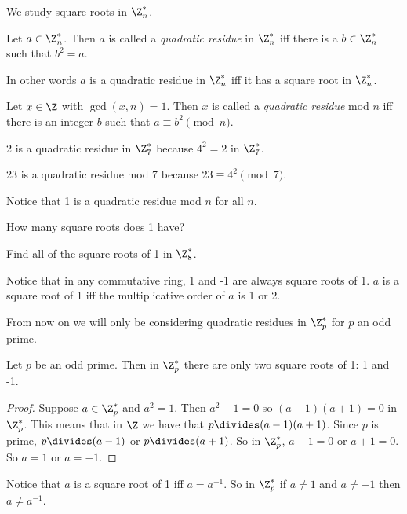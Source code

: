 \documentclass[oneside,12pt]{amsart}
\begin{document}
We study square roots in $\Z^*_n$.

\begin{definition}
Let $a\in\Z^*_n$. Then $a$ is called a \emph{quadratic residue} in $\Z^*_n$ iff there is a $b\in\Z^*_n$ such that $b^2 = a$.

In other words $a$ is a quadratic residue in $\Z^*_n$ iff it has a square root in $\Z^*_n$.

Let $x\in\Z$ with $\gcd(x,n) = 1$. Then $x$ is called a \emph{quadratic residue} mod $n$ iff there is an integer $b$ such that
$a\equiv b^2 \pmod n$.
\end{definition}

\begin{example}
2 is a quadratic residue in $\Z^*_7$ because $4^2 = 2$ in $\Z^*_7$.

23 is a quadratic residue mod 7 because $23 \equiv 4^2 \pmod 7$.
\end{example}

Notice that 1 is a quadratic residue mod $n$ for all $n$.

\begin{question}
How many square roots does 1 have?
\end{question}

\begin{in_class_example}
Find all of the square roots of 1 in $\Z^*_8$.
\end{in_class_example}

Notice that in any commutative ring, 1 and -1 are always square roots of 1.
$a$ is a square root of 1 iff the multiplicative order of $a$ is 1 or 2.

From now on we will only be considering quadratic residues in $\Z^*_p$ for $p$ an odd prime.

\begin{lemma}
Let $p$ be an odd prime. Then in $\Z^*_p$ there are only two square roots of 1: 1 and -1.
\end{lemma}
\begin{proof}
Suppose $a\in\Z^*_p$ and $a^2=1$. Then $a^2 - 1 = 0$ so $(a-1)(a+1) = 0$ in $\Z^*_p$. This means that
in $\Z$ we have that $p\divides (a-1)(a+1)$. Since $p$ is prime, $p\divides (a-1)$ or $p\divides (a+1)$.
So in $\Z^*_p$, $a-1=0$ or $a+1=0$. So $a=1$ or $a=-1$.
\end{proof}

Notice that $a$ is a square root of 1 iff $a = a^{-1}$. So in $\Z^*_p$ if $a\not=1$ and $a\not=-1$ then $a\not= a^{-1}$.
\end{document}
